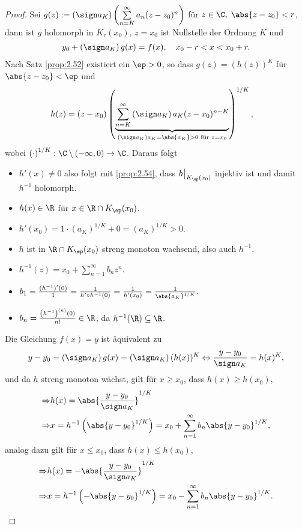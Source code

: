 \begin{proof}
Sei $g(z):= \left(\sign a_K\right) \left(\sum\limits_{n=K}^\infty a_n(z-z_0)^n 
\right)$ für $z\in \C,\;\abs{z-z_0}<r$, dann ist $g$ holomorph in $K_r(x_0)$,
$z=x_0$ ist Nullstelle der Ordnung $K$ und
\begin{align*}
y_0 + \left(\sign a_K \right)g(x) = f(x),\quad x_0-r<x<x_0+r.
\end{align*}
Nach Satz \ref{prop:2.52} existiert ein $\ep >0$, so dass $g(z) = (h(z))^K$ für
$\abs{z-z_0}<\ep$ und
\begin{align*}
h(z) &= (z-x_0)\left(\underbrace{\sum\limits_{n=K}^\infty \left(\sign
a_K\right)a_K (z-x_0)^{n-K}}_{\left(\sign a_K\right) a_K = \abs{a_K} > 0\text{
für } z=x_0} \right)^{1/K},
\end{align*}
wobei $\left(\cdot\right)^{1/K}: \C\setminus(-\infty,0)\to \C$. Daraus folgt
\begin{itemize}
  \item $h'(x)\neq0$ also folgt mit \ref{prop:2.54}, dass $h\big|_{K_\ep(x_0)}$
  injektiv ist und damit $h^{-1}$ holomorph.
  \item $h(x)\in\R$ für $x\in\R\cap K_\ep(x_0)$.
  \item $h'(x_0) = 1\cdot\left(a_K\right)^{1/K}+0 = \left(a_K\right)^{1/K} > 0$.
  \item $h$ ist in $\R\cap K_\ep(x_0)$ streng monoton wachsend, also auch
  $h^{-1}$.
  \item $h^{-1}(z) = x_0 + \sum\limits_{n=1}^\infty b_n z^n$.
  \item $b_1 = \frac{(h^{-1})'(0)}{1} = \frac{1}{h'\circ h^{-1}(0)} =
  \frac{1}{h'(x_0)} = \frac{1}{\abs{a_K}^{1/K}}$.
  \item $b_n = \frac{\left(h^{-1}\right)^{(n)}(0)}{n!}\in\R$, da
  $h^{-1}(\R)\subseteq\R$.
\end{itemize}
Die Gleichung $f(x) = y$ ist äquivalent zu
\begin{align*}
y - y_0 = \left( \sign a_K \right) g(x) = \left( \sign a_K \right) (h(x))^K
\Leftrightarrow \frac{y-y_0}{\sign a_K} = h(x)^K,
\end{align*}
und da $h$ streng monoton wächst, gilt für $x\ge x_0$, dass $h(x)\ge h(x_0)$,
\begin{align*}
 \Rightarrow &h(x) = \abs{\frac{y-y_0}{\sign a_K}}^{1/K}
\\ \Rightarrow &x = h^{-1}\left(\abs{y-y_0}^{1/K} \right) = x_0 +
\sum\limits_{n=1}^\infty b_n \abs{y-y_0}^{1/K},
\end{align*}
analog dazu gilt für $x\le x_0$, dass $h(x)\le h(x_0)$,
\begin{align*}
 \Rightarrow &h(x) = -\abs{\frac{y-y_0}{\sign a_K}}^{1/K}
\\ \Rightarrow &x = h^{-1}\left(-\abs{y-y_0}^{1/K} \right) = x_0 -
\sum\limits_{n=1}^\infty b_n \abs{y-y_0}^{1/K}.\qedhere
\end{align*}
\end{proof}

